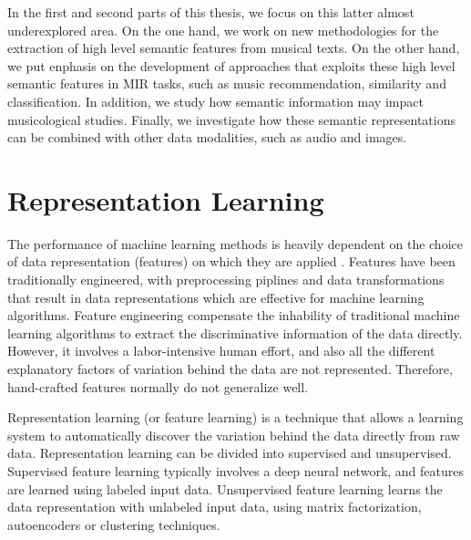 In the first and second parts of this thesis, we focus on this latter almost underexplored area. On the one hand, we work on new methodologies for the extraction of high level semantic features from musical texts. On the other hand, we put enphasis on the development of approaches that exploits these high level semantic features in MIR tasks, such as music recommendation, similarity and classification. In addition, we study how semantic information may impact musicological studies. Finally, we investigate how these semantic representations can be combined with other data modalities, such as audio and images.

\section{Representation Learning}

The performance of machine learning methods is heavily dependent on the choice of data representation (features) on which they are applied \cite{bengio2013representation}. Features have been traditionally engineered, with preprocessing piplines and data transformations that result in data representations which are effective for machine learning algorithms. Feature engineering compensate the inhability of traditional machine learning algorithms to extract the discriminative information of the data directly. However, it involves a labor-intensive human effort, and also all the different explanatory factors of variation behind the data are not represented. Therefore, hand-crafted features normally do not generalize well. 

Representation learning (or feature learning) is a technique that allows a learning system to automatically discover the variation behind the data directly from raw data. Representation learning can be divided into supervised and unsupervised. Supervised feature learning typically involves a deep neural network, and features are learned using labeled input data. Unsupervised feature learning learns the data representation with unlabeled input data, using matrix factorization, autoencoders or clustering techniques. 

